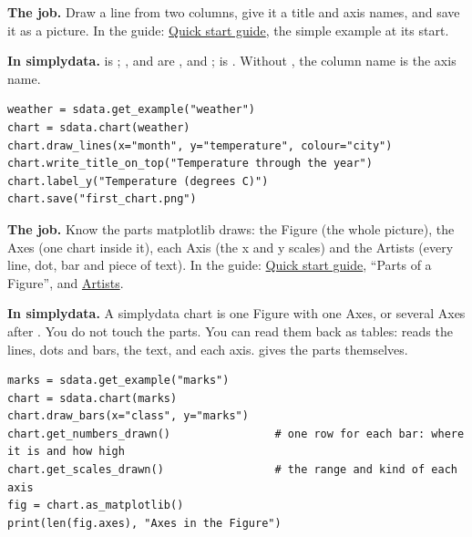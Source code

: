 
\textbf{The job.} Draw a line from two columns, give it a title and axis names, and save it as a
picture. In the guide: \href{https://matplotlib.org/stable/users/explain/quick_start.html}{Quick
start guide}, the simple example at its start.

\textbf{In simplydata.}  is ; ,
 and  are ,  and
;  is . Without , the column name is the
axis name.

\begin{lstlisting}[style=py]
weather = sdata.get_example("weather")
chart = sdata.chart(weather)
chart.draw_lines(x="month", y="temperature", colour="city")
chart.write_title_on_top("Temperature through the year")
chart.label_y("Temperature (degrees C)")
chart.save("first_chart.png")
\end{lstlisting}


\textbf{The job.} Know the parts matplotlib draws: the Figure (the whole picture), the Axes (one
chart inside it), each Axis (the x and y scales) and the Artists (every line, dot, bar and piece of
text). In the guide: \href{https://matplotlib.org/stable/users/explain/quick_start.html}{Quick start
guide}, ``Parts of a Figure'', and
\href{https://matplotlib.org/stable/users/explain/artists/index.html}{Artists}.

\textbf{In simplydata.} A simplydata chart is one Figure with one Axes, or several Axes after
. You do not touch the parts. You can read them back as
tables:  reads the lines, dots and bars,  the text,
and  each axis.  gives the parts themselves.

\begin{lstlisting}[style=py]
marks = sdata.get_example("marks")
chart = sdata.chart(marks)
chart.draw_bars(x="class", y="marks")
chart.get_numbers_drawn()                # one row for each bar: where it is and how high
chart.get_scales_drawn()                 # the range and kind of each axis
fig = chart.as_matplotlib()
print(len(fig.axes), "Axes in the Figure")
\end{lstlisting}

